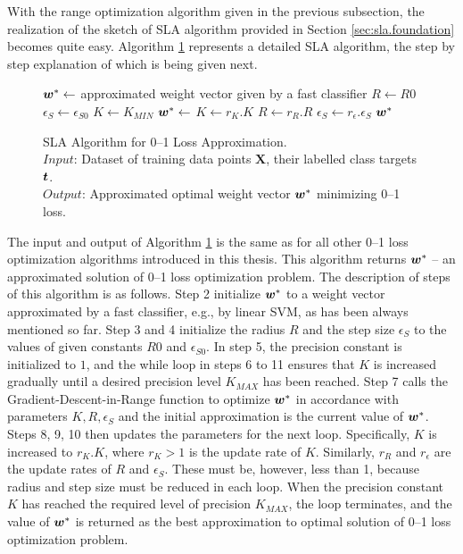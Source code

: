 With the range optimization algorithm given in the previous subsection, the realization of the sketch of SLA algorithm provided in Section \ref{sec:sla.foundation} becomes quite easy. Algorithm \ref{alg:sla.algorithm} represents a detailed SLA algorithm, the step by step explanation of which is being given next. 

\begin{figure}
\caption{
SLA Algorithm for 0--1 Loss Approximation. \\
\text{\hspace{2.1cm}} $Input$: Dataset of training data points $ \boldsymbol{X}$, their labelled class targets $\boldsymbol{t}$. \\
\text{\hspace{2.1cm}} $Output$: Approximated optimal weight vector $\boldsymbol{w}^*$ minimizing 0--1 loss.
}
\label{alg:sla.algorithm}
\begin{algorithmic}[1]
 
   \State $\boldsymbol{w}^* \gets$ approximated weight vector given by a fast classifier
   \State $R \gets R0$
   \State $\epsilon_S \gets \epsilon_{S0}$
   \State $K \gets K_{MIN}$
      \State $\boldsymbol{w}^* \gets$ 
      \State $K \gets r_K.K$
      \State $R \gets r_R.R$
      \State $\epsilon_S \gets r_\epsilon.\epsilon_S$
   \EndWhile
   \State \Return $\boldsymbol{w}^*$
\EndFunction
\end{algorithmic}
\end{figure}

The input and output of Algorithm \ref{alg:sla.algorithm} is the same as for all other 0--1 loss optimization algorithms introduced in this thesis. This algorithm returns $\boldsymbol{w}^*$ -- an approximated solution of 0--1 loss optimization problem. The description of steps of this algorithm is as follows. Step 2 initialize $\boldsymbol{w}^*$ to a weight vector approximated by a fast classifier, e.g., by linear SVM, as has been always mentioned so far. Step 3 and 4 initialize the radius $R$ and the step size $\epsilon_S$ to the values of given constants $R0$ and $\epsilon_{S0}$. In step 5, the precision constant is initialized to $1$, and the while loop in steps 6 to 11 ensures that $K$ is increased gradually until a desired precision level $K_{MAX}$ has been reached. Step 7 calls the {\sc Gradient-Descent-in-Range} function to optimize $\boldsymbol{w}^*$ in accordance with parameters $K, R, \epsilon_S$ and the initial approximation is the current value of $\boldsymbol{w}^*$. Steps 8, 9, 10 then updates the parameters for the next loop. Specifically, $K$ is increased to $r_K.K$, where $r_K>1$ is the update rate of $K$. Similarly, $r_R$ and $r_\epsilon$ are the update rates of $R$ and $\epsilon_S$. These must be, however, less than 1, because radius and step size must be reduced in each loop. When the precision constant $K$ has reached the required level of precision $K_{MAX}$, the loop terminates, and the value of $\boldsymbol{w}^*$ is returned as the best approximation to optimal solution of 0--1 loss optimization problem. 

